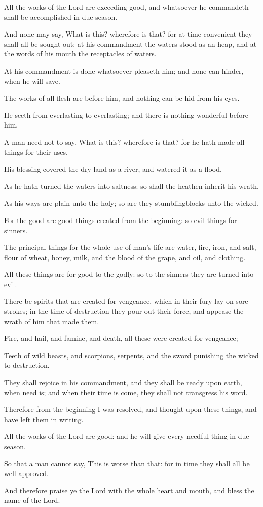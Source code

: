 {\par }{\PP {}All the works of the Lord are exceeding good, and whatsoever he commandeth shall be accomplished in due season.
\par }{\PP {}And none may say, What is this? wherefore is that? for at time convenient they shall all be sought out: at his commandment the waters stood as an heap, and at the words of his mouth the receptacles of waters.
\par }{\PP {}At his commandment is done whatsoever pleaseth him; and none can hinder, when he will save.
\par }{\PP {}The works of all flesh are before him, and nothing can be hid from his eyes.
\par }{\PP {}He seeth from everlasting to everlasting; and there is nothing wonderful before him.
\par }{\PP {}A man need not to say, What is this? wherefore is that? for he hath made all things for their uses.
\par }{\PP {}His blessing covered the dry land as a river, and watered it as a flood.
\par }{\PP {}As he hath turned the waters into saltness: so shall the heathen inherit his wrath.
\par }{\PP {}As his ways are plain unto the holy; so are they stumblingblocks unto the wicked.
\par }{\PP {}For the good are good things created from the beginning: so evil things for sinners.
\par }{\PP {}The principal things for the whole use of man’s life are water, fire, iron, and salt, flour of wheat, honey, milk, and the blood of the grape, and oil, and clothing.
\par }{\PP {}All these things are for good to the godly: so to the sinners they are turned into evil.
\par }{\PP {}There be spirits that are created for vengeance, which in their fury lay on sore strokes; in the time of destruction they pour out their force, and appease the wrath of him that made them.
\par }{\PP {}Fire, and hail, and famine, and death, all these were created for vengeance;
\par }{\PP {}Teeth of wild beasts, and scorpions, serpents, and the sword punishing the wicked to destruction.
\par }{\PP {}They shall rejoice in his commandment, and they shall be ready upon earth, when need is; and when their time is come, they shall not transgress his word.
\par }{\PP {}Therefore from the beginning I was resolved, and thought upon these things, and have left them in writing.
\par }{\PP {}All the works of the Lord are good: and he will give every needful thing in due season.
\par }{\PP {}So that a man cannot say, This is worse than that: for in time they shall all be well approved.
\par }{\PP {}And therefore praise ye the Lord with the whole heart and mouth, and bless the name of the Lord.

}
